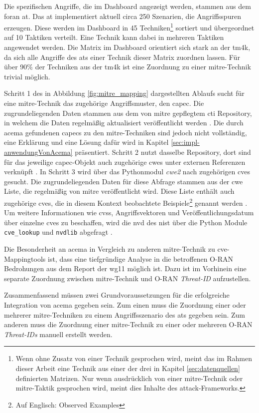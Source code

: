 \par Die spezifischen Angriffe, die im Dashboard angezeigt werden, stammen aus dem \gls{foran} \gls{at}. Das \gls{at} implementiert aktuell circa 250 Szenarien, die Angriffsspuren erzeugen. Diese werden im Dashboard in 45 Techniken\footnote{Wenn ohne Zusatz von einer Technik gesprochen wird, meint das im Rahmen dieser Arbeit eine Technik aus einer der drei in Kapitel \ref{sec:datenquellen} definierten Matrizen. Nur wenn ausdrücklich von einer \gls{mitre}-Technik oder \gls{mitre}-Taktik gesprochen wird, meint dies Inhalte des \gls{attack}-Frameworks.} sortiert und übergeordnet auf 10 Taktiken verteilt. Eine Technik kann dabei in mehreren Taktiken angewendet werden. Die Matrix im Dashboard orientiert sich stark an der \gls{tm4k}, da sich alle Angriffe des \gls{at}s einer Technik dieser Matrix zuordnen lassen. Für über 90\% der Techniken aus der \gls{tm4k} ist eine Zuordnung zu einer \gls{mitre}-Technik trivial möglich.
\par Schritt 1 des in Abbildung \ref{fig:mitre_mapping} dargestellten Ablaufs sucht für eine \gls{mitre}-Technik das zugehörige Angriffsmuster, den \gls{capec}. Die zugrundeliegenden Daten stammen aus dem von \gls{mitre} gepflegtem \gls{cti} Repository, in welchem die Daten regelmäßig aktualisiert veröffentlicht werden \autocite{MitreCtiCyber}. Die durch \gls{acema} gefundenen \glspl{capec} zu den \gls{mitre}-Techniken sind jedoch nicht vollständig, eine Erklärung und eine Lösung dafür wird in Kapitel \ref{sec:impl-anwendungVonAcema} präsentiert. Schritt 2 nutzt dasselbe Repository, dort sind für das jeweilige \gls{capec}-Objekt auch zugehörige \glspl{cwe} unter externen Referenzen verknüpft \autocite{CtiUSAGEmdMaster}. In Schritt 3 wird über das Pythonmodul \textit{cwe2} nach zugehörigen \glspl{cve} gesucht. Die zugrundeliegenden Daten für diese Abfrage stammen aus der \gls{cwe} Liste, die regelmäßig von \gls{mitre} veröffentlicht wird. Diese Liste enthält auch zugehörige \glspl{cve}, die in diesem Kontext \glqq{}beobachtete Beispiele\grqq{}\footnote{Auf Englisch: \glqq{}Observed Examples\grqq} genannt werden \autocite{AboutcodeorgCwe22024,CWEDownloads}. Um weitere Informationen wie \gls{cvss}, Angriffsvektoren und Veröffentlichungsdatum über einzelne \glspl{cve} zu beschaffen, wird die \gls{nvd} des \gls{nist} über die Python Module \verb|cve_lookup| und \verb|nvdlib| abgefragt \autocite{NVDLibNVDLibNIST,MachineThingCve_lookupLook,NVDHome}.
\par Die Besonderheit an \gls{acema} in Vergleich zu anderen \gls{mitre}-Technik zu \gls{cve}-Mappingtools ist, dass eine tiefgründige Analyse in die betroffenen O-RAN Bedrohungen aus dem Report der \gls{wg11} möglich ist. Dazu ist im Vorhinein eine separate Zuordnung zwischen \gls{mitre}-Technik und O-RAN \textit{Threat-ID} aufzustellen.
\par Zusammenfassend müssen zwei Grundvoraussetzungen für die erfolgreiche Integration von \gls{acema} gegeben sein. Zum einen muss die Zuordnung einer oder mehrerer \gls{mitre}-Techniken zu einem Angriffsszenario des \gls{at}s gegeben sein. Zum anderen muss die Zuordnung einer \gls{mitre}-Technik zu einer oder mehreren O-RAN \textit{Threat-IDs} manuell erstellt werden.


